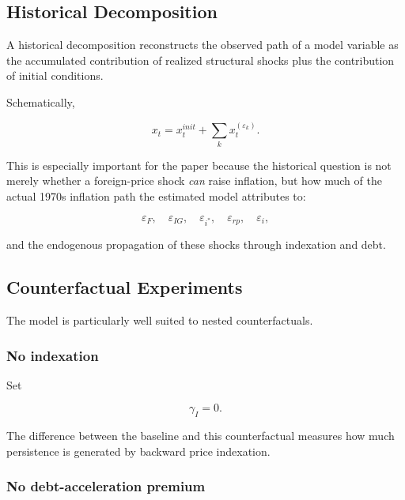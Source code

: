 \subsection{Historical Decomposition}
\label{app:historical_decomposition}

A historical decomposition reconstructs the observed path of a model variable
as the accumulated contribution of realized structural shocks plus the
contribution of initial conditions.

Schematically,

\begin{equation}
x_t
=
x_t^{init}
+
\sum_k x_{t}^{(\varepsilon_k)}.
\end{equation}

This is especially important for the paper because the historical question is
not merely whether a foreign-price shock \emph{can} raise inflation, but how
much of the actual 1970s inflation path the estimated model attributes to:

\[
\varepsilon_F,\quad
\varepsilon_{IG},\quad
\varepsilon_{i^*},\quad
\varepsilon_{rp},\quad
\varepsilon_i,
\]

and the endogenous propagation of these shocks through indexation and debt.

\subsection{Counterfactual Experiments}
\label{app:counterfactuals}

The model is particularly well suited to nested counterfactuals.

\subsubsection{No indexation}

Set

\[
\gamma_I=0.
\]

The difference between the baseline and this counterfactual measures how much
persistence is generated by backward price indexation.

\subsubsection{No debt-acceleration premium}

